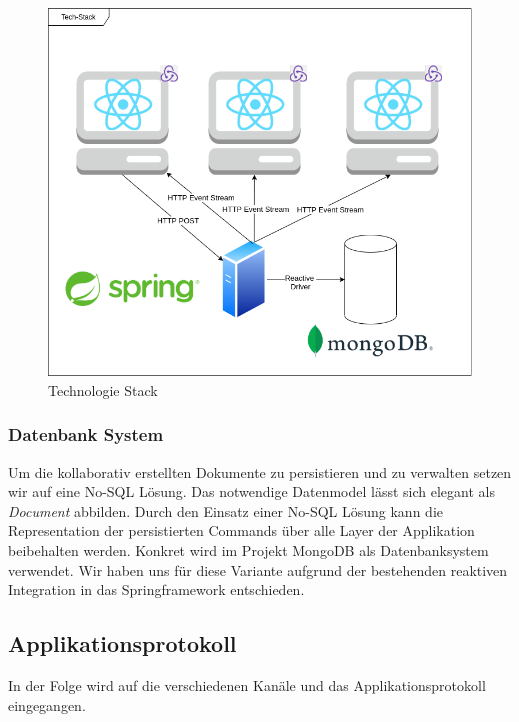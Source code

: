 \begin{figure}[h]
    \centering
    \begin{minipage}[b]{\textwidth}
        \includegraphics[width=\textwidth]{images/TechStack2.drawio}
        \caption{Technologie Stack}
    \end{minipage}\label{fig:figstack}
\end{figure}

\subsubsection{Datenbank System}
Um die kollaborativ erstellten Dokumente zu persistieren und zu verwalten setzen wir auf eine No-SQL Lösung.
Das notwendige Datenmodel lässt sich elegant als \emph{Document} abbilden.
Durch den Einsatz einer No-SQL Lösung kann die Representation der persistierten Commands über alle Layer der Applikation beibehalten werden\@.
Konkret wird im Projekt MongoDB als Datenbanksystem verwendet.
Wir haben uns für diese Variante aufgrund der bestehenden reaktiven Integration in das Springframework entschieden.

\clearpage

\subsection{Applikationsprotokoll}
In der Folge wird auf die verschiedenen Kanäle und das Applikationsprotokoll eingegangen.

